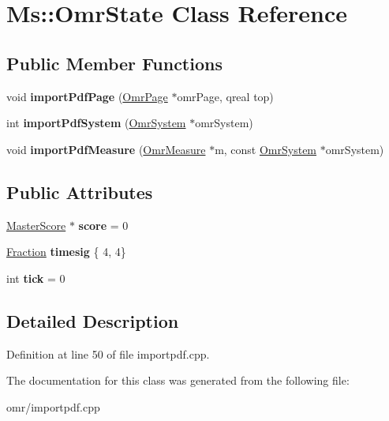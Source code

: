 \hypertarget{class_ms_1_1_omr_state}{}\section{Ms\+:\+:Omr\+State Class Reference}
\label{class_ms_1_1_omr_state}
\subsection*{Public Member Functions}
\begin{DoxyCompactItemize}
\item 
\mbox{\label{class_ms_1_1_omr_state_aed93b14fe10d987ad2e6cb4acbf0b7c6}} 
void {\bfseries import\+Pdf\+Page} (\hyperlink{class_ms_1_1_omr_page}{Omr\+Page} $\ast$omr\+Page, qreal top)
\item 
\mbox{\label{class_ms_1_1_omr_state_a59777bcc642f00d0defadb39be4cf184}} 
int {\bfseries import\+Pdf\+System} (\hyperlink{class_ms_1_1_omr_system}{Omr\+System} $\ast$omr\+System)
\item 
\mbox{\label{class_ms_1_1_omr_state_a4bdb3811c09baff5bf27c17de9aeca4b}} 
void {\bfseries import\+Pdf\+Measure} (\hyperlink{class_ms_1_1_omr_measure}{Omr\+Measure} $\ast$m, const \hyperlink{class_ms_1_1_omr_system}{Omr\+System} $\ast$omr\+System)
\end{DoxyCompactItemize}
\subsection*{Public Attributes}
\begin{DoxyCompactItemize}
\item 
\mbox{\label{class_ms_1_1_omr_state_a53ac6a9b161b5bee33cba48269180f6e}} 
\hyperlink{class_ms_1_1_master_score}{Master\+Score} $\ast$ {\bfseries score} = 0
\item 
\mbox{\label{class_ms_1_1_omr_state_a2cce91fd1a16f1522b9bb51be670ff21}} 
\hyperlink{class_ms_1_1_fraction}{Fraction} {\bfseries timesig} \{ 4, 4\}
\item 
\mbox{\label{class_ms_1_1_omr_state_a0e99fe26a28667edf906169393dc3280}} 
int {\bfseries tick} = 0
\end{DoxyCompactItemize}


\subsection{Detailed Description}


Definition at line 50 of file importpdf.\+cpp.



The documentation for this class was generated from the following file\+:\begin{DoxyCompactItemize}
\item 
omr/importpdf.\+cpp\end{DoxyCompactItemize}
